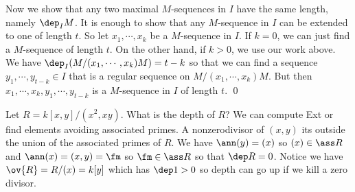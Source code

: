 Now we show that any two maximal $M$-sequences in $I$ have the same length, namely $\dep_I M$. It is enough to show that any $M$-sequence in $I$ can be extended to one of length $t$. So let $x_1,\cdots,x_k$ be a $M$-sequence in $I$. If $k=0$, we can just find a $M$-sequence of length $t$. On the other hand, if $k>0$, we use our work above. We have $\dep_I(M/(x_1,\cdots,x_k)M)=t-k$ so that we can find a sequence $y_1,\cdots,y_{t-k} \in I$ that is a regular sequence on $M/(x_1,\cdots,x_k)M$. But then $x_1,\cdots,x_k,y_1,\cdots,y_{t-k}$ is a $M$-sequence in $I$ of length $t$. \qed \\












































































\begin{ex}
Let $R=k[x,y]/(x^2,xy)$. What is the depth of $R$? We can compute Ext or find elements avoiding associated primes. A nonzerodivisor of $(x,y)$ its outside the union of the associated primes of $R$. We have $\ann(y)=(x)$ so $(x) \in \ass R$ and $\ann(x)=(x,y)=\fm$ so $\fm \in \ass R$ so that $\dep R=0$. Notice we have $\ov{R}=R/(x)=k[y]$ which has $\dep 1>0$ so depth can go up if we kill a zero divisor. 
\end{ex}

